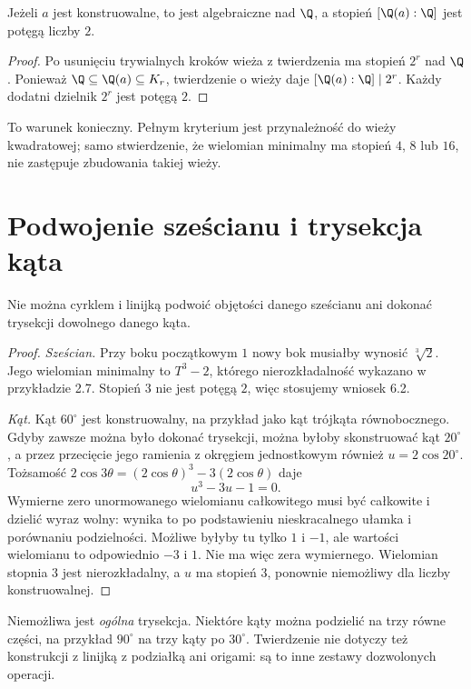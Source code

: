 \begin{wniosek}
Jeżeli $a$ jest konstruowalne, to jest algebraiczne nad $\Q$, a stopień $[\Q(a):\Q]$ jest potęgą liczby $2$.
\end{wniosek}
\begin{proof}
Po usunięciu trywialnych kroków wieża z twierdzenia ma stopień $2^r$ nad $\Q$. Ponieważ $\Q\subseteq\Q(a)\subseteq K_r$, twierdzenie o wieży daje $[\Q(a):\Q]\mid 2^r$. Każdy dodatni dzielnik $2^r$ jest potęgą $2$.
\end{proof}

To warunek konieczny. Pełnym kryterium jest przynależność do wieży kwadratowej; samo stwierdzenie, że wielomian minimalny ma stopień $4$, $8$ lub $16$, nie zastępuje zbudowania takiej wieży.

\section{Podwojenie sześcianu i trysekcja kąta}

\begin{twierdzenie}
Nie można cyrklem i linijką podwoić objętości danego sześcianu ani dokonać trysekcji dowolnego danego kąta.
\end{twierdzenie}
\begin{proof}
\emph{Sześcian.} Przy boku początkowym $1$ nowy bok musiałby wynosić $\sqrt[3]{2}$. Jego wielomian minimalny to $T^3-2$, którego nierozkładalność wykazano w przykładzie 2.7. Stopień $3$ nie jest potęgą $2$, więc stosujemy wniosek 6.2.

\emph{Kąt.} Kąt $60^\circ$ jest konstruowalny, na przykład jako kąt trójkąta równobocznego. Gdyby zawsze można było dokonać trysekcji, można byłoby skonstruować kąt $20^\circ$, a przez przecięcie jego ramienia z okręgiem jednostkowym również $u=2\cos20^\circ$. Tożsamość $2\cos3\theta=(2\cos\theta)^3-3(2\cos\theta)$ daje
\[
u^3-3u-1=0.
\]
Wymierne zero unormowanego wielomianu całkowitego musi być całkowite i dzielić wyraz wolny: wynika to po podstawieniu nieskracalnego ułamka i porównaniu podzielności. Możliwe byłyby tu tylko $1$ i $-1$, ale wartości wielomianu to odpowiednio $-3$ i $1$. Nie ma więc zera wymiernego. Wielomian stopnia $3$ jest nierozkładalny, a $u$ ma stopień $3$, ponownie niemożliwy dla liczby konstruowalnej.
\end{proof}

Niemożliwa jest \emph{ogólna} trysekcja. Niektóre kąty można podzielić na trzy równe części, na przykład $90^\circ$ na trzy kąty po $30^\circ$. Twierdzenie nie dotyczy też konstrukcji z linijką z podziałką ani origami: są to inne zestawy dozwolonych operacji.

